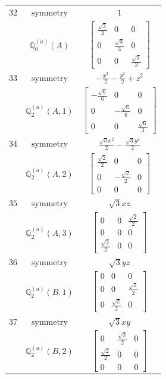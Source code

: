 \documentclass[fleqn,8pt,landscape]{jsarticle}
\begin{document}
\begin{longtable}{ccc}
$ 32 $ & $ \text{symmetry} $ & $ 1 $ \\
$  $ & $ \mathbb{Q}_{0}^{(a)}(A) $ & $ \begin{bmatrix} \frac{\sqrt{3}}{3} & 0 & 0 \\ 0 & \frac{\sqrt{3}}{3} & 0 \\ 0 & 0 & \frac{\sqrt{3}}{3} \end{bmatrix} $ \\ \hline
$ 33 $ & $ \text{symmetry} $ & $ - \frac{x^{2}}{2} - \frac{y^{2}}{2} + z^{2} $ \\
$  $ & $ \mathbb{Q}_{2}^{(a)}(A,1) $ & $ \begin{bmatrix} - \frac{\sqrt{6}}{6} & 0 & 0 \\ 0 & - \frac{\sqrt{6}}{6} & 0 \\ 0 & 0 & \frac{\sqrt{6}}{3} \end{bmatrix} $ \\ \hline
$ 34 $ & $ \text{symmetry} $ & $ \frac{\sqrt{3} x^{2}}{2} - \frac{\sqrt{3} y^{2}}{2} $ \\
$  $ & $ \mathbb{Q}_{2}^{(a)}(A,2) $ & $ \begin{bmatrix} \frac{\sqrt{2}}{2} & 0 & 0 \\ 0 & - \frac{\sqrt{2}}{2} & 0 \\ 0 & 0 & 0 \end{bmatrix} $ \\ \hline
$ 35 $ & $ \text{symmetry} $ & $ \sqrt{3} x z $ \\
$  $ & $ \mathbb{Q}_{2}^{(a)}(A,3) $ & $ \begin{bmatrix} 0 & 0 & \frac{\sqrt{2}}{2} \\ 0 & 0 & 0 \\ \frac{\sqrt{2}}{2} & 0 & 0 \end{bmatrix} $ \\ \hline
$ 36 $ & $ \text{symmetry} $ & $ \sqrt{3} y z $ \\
$  $ & $ \mathbb{Q}_{2}^{(a)}(B,1) $ & $ \begin{bmatrix} 0 & 0 & 0 \\ 0 & 0 & \frac{\sqrt{2}}{2} \\ 0 & \frac{\sqrt{2}}{2} & 0 \end{bmatrix} $ \\ \hline
$ 37 $ & $ \text{symmetry} $ & $ \sqrt{3} x y $ \\
$  $ & $ \mathbb{Q}_{2}^{(a)}(B,2) $ & $ \begin{bmatrix} 0 & \frac{\sqrt{2}}{2} & 0 \\ \frac{\sqrt{2}}{2} & 0 & 0 \\ 0 & 0 & 0 \end{bmatrix} $ \\ \hline

\end{longtable}
\end{document}
